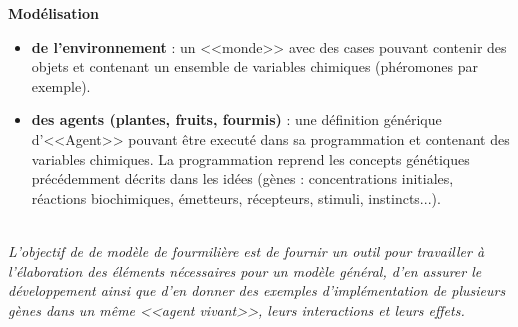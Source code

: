 \documentclass[11pt,twoside,a4paper]{article}
\begin{document}
\textbf{Mod{\'e}lisation}
\begin{itemize} 
	\item \textbf{de l'environnement} : un <<monde>> avec des cases pouvant contenir des objets et contenant un ensemble de variables chimiques (ph{\'e}romones par exemple).
	\item \textbf{des agents (plantes, fruits, fourmis)} : une d{\'e}finition g{\'e}n{\'e}rique d'<<Agent>> pouvant {\^e}tre execut{\'e} dans sa programmation et contenant des variables chimiques. La programmation reprend les concepts g{\'e}n{\'e}tiques pr{\'e}c{\'e}demment d{\'e}crits dans les id{\'e}es (g{\`e}nes : concentrations initiales, r{\'e}actions biochimiques, {\'e}metteurs, r{\'e}cepteurs, stimuli, instincts...).
\end{itemize}~\\

\emph{L'objectif de de mod{\`e}le de fourmili{\`e}re est de fournir un outil pour travailler {\`a} l'{\'e}laboration des {\'e}l{\'e}ments n{\'e}cessaires pour un mod{\`e}le g{\'e}n{\'e}ral, d'en assurer le d{\'e}veloppement ainsi que d'en donner des exemples d'impl{\'e}mentation de plusieurs g{\`e}nes dans un m{\^e}me <<agent vivant>>, leurs interactions et leurs effets. }

\end{document}
